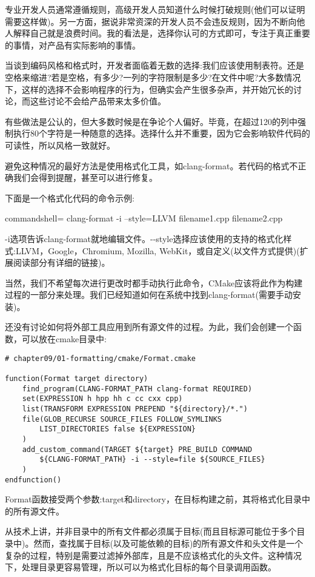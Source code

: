 专业开发人员通常遵循规则，高级开发人员知道什么时候打破规则(他们可以证明需要这样做)。另一方面，据说非常资深的开发人员不会违反规则，因为不断向他人解释自己就是浪费时间。我的看法是，选择你认可的方式即可，专注于真正重要的事情，对产品有实际影响的事情。

当谈到编码风格和格式时，开发者面临着无数的选择:我们应该使用制表符。还是空格来缩进?若是空格，有多少?一列的字符限制是多少?在文件中呢?大多数情况下，这样的选择不会影响程序的行为，但确实会产生很多杂声，并开始冗长的讨论，而这些讨论不会给产品带来太多价值。

有些做法是公认的，但大多数时候是在争论个人偏好。毕竟，在超过120的列中强制执行80个字符是一种随意的选择。选择什么并不重要，因为它会影响软件代码的可读性，所以风格一致就好。

避免这种情况的最好方法是使用格式化工具，如clang-format。若代码的格式不正确我们会得到提醒，甚至可以进行修复。

下面是一个格式化代码的命令示例:

\begin{tcblisting}{commandshell={}}
clang-format -i --style=LLVM filename1.cpp filename2.cpp
\end{tcblisting}

-i选项告诉clang-format就地编辑文件。-{}-style选择应该使用的支持的格式化样式:LLVM，Google，Chromium, Mozilla, WebKit，或自定义(以文件方式提供)(扩展阅读部分有详细的链接)。

当然，我们不希望每次进行更改时都手动执行此命令，CMake应该将此作为构建过程的一部分来处理。我们已经知道如何在系统中找到clang-format(需要手动安装)。

还没有讨论如何将外部工具应用到所有源文件的过程。为此，我们会创建一个函数，可以放在cmake目录中:

\begin{lstlisting}[style=styleCMake]
# chapter09/01-formatting/cmake/Format.cmake

function(Format target directory)
	find_program(CLANG-FORMAT_PATH clang-format REQUIRED)
	set(EXPRESSION h hpp hh c cc cxx cpp)
	list(TRANSFORM EXPRESSION PREPEND "${directory}/*.")
	file(GLOB_RECURSE SOURCE_FILES FOLLOW_SYMLINKS
		LIST_DIRECTORIES false ${EXPRESSION}
	)
	add_custom_command(TARGET ${target} PRE_BUILD COMMAND
		${CLANG-FORMAT_PATH} -i --style=file ${SOURCE_FILES}
	)
endfunction()
\end{lstlisting}

Format函数接受两个参数:target和directory，在目标构建之前，其将格式化目录中的所有源文件。

从技术上讲，并非目录中的所有文件都必须属于目标(而且目标源可能位于多个目录中)。然而，查找属于目标(以及可能依赖的目标)的所有源文件和头文件是一个复杂的过程，特别是需要过滤掉外部库，且是不应该格式化的头文件。这种情况下，处理目录更容易管理，所以可以为格式化目标的每个目录调用函数。

